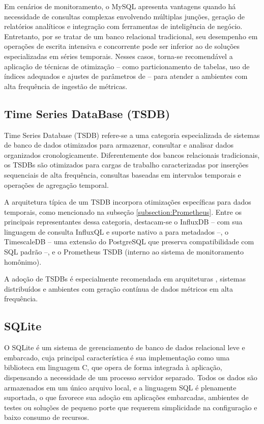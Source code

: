 Em cenários de monitoramento, o MySQL apresenta vantagens quando há necessidade de consultas complexas envolvendo múltiplas junções, geração de relatórios analíticos e integração com ferramentas de inteligência de negócio. Entretanto, por se tratar de um banco relacional tradicional, seu desempenho em operações de escrita intensiva e concorrente pode ser inferior ao de soluções especializadas em séries temporais. Nesses casos, torna-se recomendável a aplicação de técnicas de otimização -- como particionamento de tabelas, uso de índices adequados e ajustes de parâmetros de  -- para atender a ambientes com alta frequência de ingestão de métricas.

\subsection{Time Series DataBase (TSDB)}
\label{subsection:TSDB}

Time Series Database (TSDB) \citep{tigerdata2024} refere-se a uma categoria especializada de sistemas de banco de dados otimizados para armazenar, consultar e analisar dados organizados cronologicamente. Diferentemente dos bancos relacionais tradicionais, os TSDBs são otimizados para cargas de trabalho caracterizadas por inserções sequenciais de alta frequência, consultas baseadas em intervalos temporais e operações de agregação temporal.

A arquitetura típica de um TSDB incorpora otimizações específicas para dados temporais, como mencionado na subseção \ref{subsection:Prometheus}. Entre os principais representantes dessa categoria, destacam-se o InfluxDB -- com sua linguagem de consulta InfluxQL e suporte nativo a  para metadados --, o TimescaleDB -- uma extensão do PostgreSQL que preserva compatibilidade com SQL padrão --, e o Prometheus TSDB (interno ao sistema de monitoramento homônimo).

A adoção de TSDBs é especialmente recomendada em arquiteturas , sistemas distribuídos e ambientes com geração contínua de dados métricos em alta frequência.

\subsection{SQLite}
\label{subsection:SQLite}

O SQLite \citep{sqlite2025} é um sistema de gerenciamento de banco de dados relacional leve e embarcado, cuja principal característica é sua implementação como uma biblioteca em linguagem C, que opera de forma integrada à aplicação, dispensando a necessidade de um processo servidor separado. Todos os dados são armazenados em um único arquivo local, e a linguagem SQL é plenamente suportada, o que favorece sua adoção em aplicações embarcadas, ambientes de testes ou soluções de pequeno porte que requerem simplicidade na configuração e baixo consumo de recursos.

